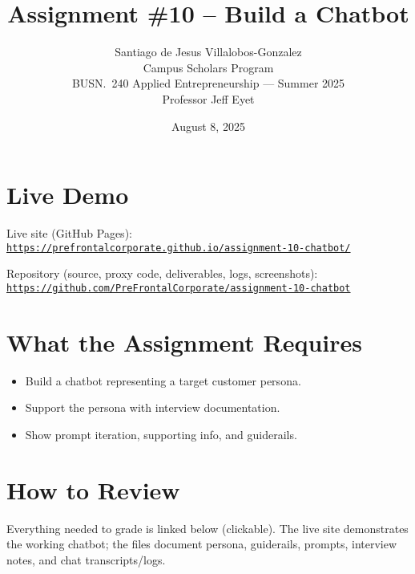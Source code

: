 \documentclass[11pt]{article}
\title{\textbf{Assignment \#10 – Build a Chatbot}}
\author{Santiago de Jesus Villalobos-Gonzalez\\
Campus Scholars Program\\
BUSN.\ 240 Applied Entrepreneurship — Summer 2025\\
Professor Jeff Eyet}
\date{August 8, 2025}
\begin{document}
\maketitle

\section*{Live Demo}
\noindent Live site (GitHub Pages): \href{https://prefrontalcorporate.github.io/assignment-10-chatbot/}{\texttt{https://prefrontalcorporate.github.io/assignment-10-chatbot/}}

\bigskip
\noindent Repository (source, proxy code, deliverables, logs, screenshots): \href{https://github.com/PreFrontalCorporate/assignment-10-chatbot}{\texttt{https://github.com/PreFrontalCorporate/assignment-10-chatbot}}

\section*{What the Assignment Requires}
\begin{itemize}[leftmargin=1.2em]
  \item Build a chatbot representing a target customer persona.
  \item Support the persona with interview documentation.
  \item Show prompt iteration, supporting info, and guiderails.
\end{itemize}

\section*{How to Review}
Everything needed to grade is linked below (clickable). The live site demonstrates the working chatbot; the files document persona, guiderails, prompts, interview notes, and chat transcripts/logs.
\end{document}
